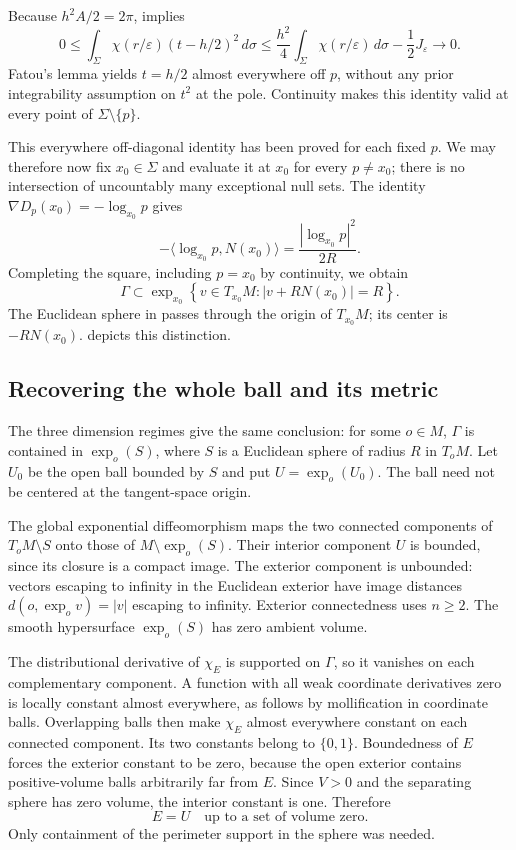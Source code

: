 Because $h^2A/2=2\pi$,  implies
\[
 0\le\int_\Sigma\chi(r/\varepsilon)(t-h/2)^2\,d\sigma
 \le \frac{h^2}{4}\int_\Sigma\chi(r/\varepsilon)\,d\sigma
              -\frac12J_\varepsilon\longrightarrow0.
\]
Fatou's lemma yields $t=h/2$ almost everywhere off $p$, without any
prior integrability assumption on $t^2$ at the pole. Continuity makes
this identity valid at every point of $\Sigma\setminus\{p\}$.

This everywhere off-diagonal identity has been proved for each fixed
$p$. We may therefore now fix $x_0\in\Sigma$ and evaluate it at $x_0$
for every $p\ne x_0$; there is no intersection of uncountably many
exceptional null sets. The identity
$\nabla D_p(x_0)=-\log_{x_0}p$ gives
\[
 -\langle\log_{x_0}p,N(x_0)\rangle
     =\frac{|\log_{x_0}p|^2}{2R}.
\]
Completing the square, including $p=x_0$ by continuity, we obtain
\begin{equation}\label{eq:offset-sphere}
 \Gamma\subset\exp_{x_0}
 \left\{v\in T_{x_0}M:|v+RN(x_0)|=R\right\}.
\end{equation}
The Euclidean sphere in  passes through the
origin of $T_{x_0}M$; its center is $-RN(x_0)$.
 depicts this distinction.




\subsection{Recovering the whole ball and its metric}
The three dimension regimes give the same conclusion: for some $o\in M$,
$\Gamma$ is contained in $\exp_o(S)$, where $S$ is a Euclidean sphere
of radius $R$ in $T_oM$. Let $U_0$ be the open ball bounded by $S$ and
put $U=\exp_o(U_0)$. The ball need not be centered at the tangent-space
origin.

The global exponential diffeomorphism maps the two connected components
of $T_oM\setminus S$ onto those of $M\setminus\exp_o(S)$.
Their interior component $U$ is bounded, since its closure is a compact
image. The exterior component is unbounded: vectors escaping to infinity
in the Euclidean exterior have image distances $d(o,\exp_o v)=|v|$
escaping to infinity. Exterior connectedness uses $n\ge2$.
The smooth hypersurface $\exp_o(S)$ has zero ambient volume.

The distributional derivative of $\chi_E$ is supported on $\Gamma$,
so it vanishes on each complementary component. A function with all
weak coordinate derivatives zero is locally constant almost everywhere,
as follows by mollification in coordinate balls. Overlapping balls
then make $\chi_E$ almost everywhere constant on each connected component.
Its two constants belong to $\{0,1\}$. Boundedness of $E$ forces the
exterior constant to be zero, because the open exterior contains
positive-volume balls arbitrarily far from $E$. Since $V>0$ and the
separating sphere has zero volume, the interior constant is one.
Therefore
\begin{equation}\label{eq:phase-recovery}
 E=U\quad\text{up to a set of volume zero}.
\end{equation}
Only containment of the perimeter support in the sphere was needed.

